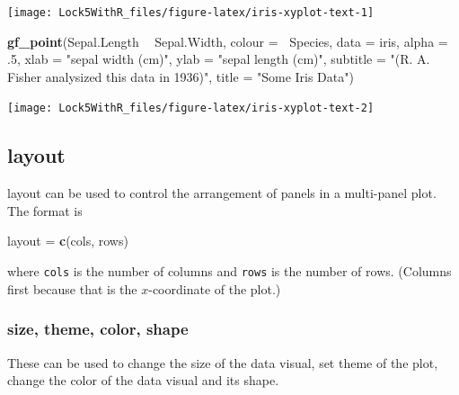 \documentclass[]{book}
\newenvironment{Shaded}{\begin{snugshade}}{\end{snugshade}}
\newcommand{\DataTypeTok}[1]{\textcolor[rgb]{0.13,0.29,0.53}{#1}}
\newcommand{\DecValTok}[1]{\textcolor[rgb]{0.00,0.00,0.81}{#1}}
\newcommand{\FloatTok}[1]{\textcolor[rgb]{0.00,0.00,0.81}{#1}}
\newcommand{\KeywordTok}[1]{\textcolor[rgb]{0.13,0.29,0.53}{\textbf{#1}}}
\newcommand{\NormalTok}[1]{#1}
\newcommand{\OperatorTok}[1]{\textcolor[rgb]{0.81,0.36,0.00}{\textbf{#1}}}
\newcommand{\StringTok}[1]{\textcolor[rgb]{0.31,0.60,0.02}{#1}}
\begin{document}
\texttt{[image: Lock5WithR\_files/figure-latex/iris-xyplot-text-1]}

\begin{Shaded}
\begin{Highlighting}[]
\KeywordTok{gf_point}\NormalTok{(Sepal.Length }\OperatorTok{~}\StringTok{ }\NormalTok{Sepal.Width, }\DataTypeTok{colour =} \OperatorTok{~}\NormalTok{Species, }\DataTypeTok{data =}\NormalTok{ iris, }\DataTypeTok{alpha =} \FloatTok{.5}\NormalTok{, }
         \DataTypeTok{xlab =} \StringTok{"sepal width (cm)"}\NormalTok{, }
         \DataTypeTok{ylab =} \StringTok{"sepal length (cm)"}\NormalTok{, }
         \DataTypeTok{subtitle =} \StringTok{"(R. A. Fisher analysized this data in 1936)"}\NormalTok{, }
         \DataTypeTok{title =} \StringTok{"Some Iris Data"}\NormalTok{)}
\end{Highlighting}
\end{Shaded}

\texttt{[image: Lock5WithR\_files/figure-latex/iris-xyplot-text-2]}

\hypertarget{layout}{%
\subsection{layout}\label{layout}}

{layout} can be used to control the arrangement of panels in a multi-panel
plot. The format is

\begin{Shaded}
\begin{Highlighting}[]
\NormalTok{layout =}\StringTok{ }\KeywordTok{c}\NormalTok{(cols, rows)}
\end{Highlighting}
\end{Shaded}

where \texttt{cols} is the number of columns and \texttt{rows} is the number of
rows. (Columns first because that is the \(x\)-coordinate of the plot.)

\hypertarget{size-theme-color-shape}{%
\subsubsection{size, theme, color, shape}\label{size-theme-color-shape}}

These can be used to change the size of the data visual, set theme of the plot, change the color of the data visual and its shape.

\begin{Shaded}
\end{Shaded}
\end{document}
